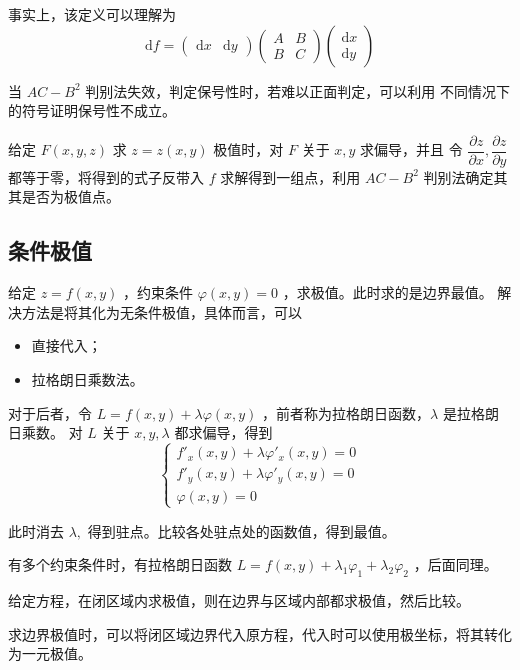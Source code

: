 事实上，该定义可以理解为$$
    \mathrm{d}f = \begin{pmatrix}
        \mathrm{d}x & \mathrm{d}y
    \end{pmatrix}\begin{pmatrix}
        A&B\\B&C
    \end{pmatrix}\begin{pmatrix}
        \mathrm{d}x\\\mathrm{d}y
    \end{pmatrix}
$$ 

当 $ AC-B^2 $ 判别法失效，判定保号性时，若难以正面判定，可以利用
不同情况下的符号证明保号性不成立。

给定 $ F(x,y,z) $ 求 $ z = z(x,y) $ 极值时，对 $ F $ 关于 $ x,y $ 求偏导，并且
令 $ \dfrac{\partial z}{\partial x},\dfrac{\partial z}{\partial y} $ 
都等于零，将得到的式子反带入 $ f $ 求解得到一组点，利用 $ AC-B^2 $ 判别法确定其
其是否为极值点。

\subsection{条件极值}

给定 $ z = f(x,y) $ ，约束条件 $ \varphi(x,y) = 0 $ ，求极值。此时求的是边界最值。
解决方法是将其化为无条件极值，具体而言，可以
\begin{itemize}
    \item 直接代入；
    \item 拉格朗日乘数法。
\end{itemize}

对于后者，令 $ L = f(x,y) + \lambda\varphi(x,y) $ ，前者称为拉格朗日函数，$ \lambda $ 是拉格朗日乘数。
对 $ L $ 关于 $ x,y,\lambda $ 都求偏导，得到
$$
    \begin{cases}
        f'_x(x,y) + \lambda\varphi'_x(x,y) = 0\\ 
        f'_y(x,y) + \lambda\varphi'_y(x,y) = 0\\ 
        \varphi(x,y) = 0
    \end{cases}
$$ 

此时消去 $ \lambda, $ 得到驻点。比较各处驻点处的函数值，得到最值。

有多个约束条件时，有拉格朗日函数 $ L = f(x,y) + \lambda_1\varphi_1 + \lambda_2\varphi_2 $ ，后面同理。

给定方程，在闭区域内求极值，则在边界与区域内部都求极值，然后比较。

求边界极值时，可以将闭区域边界代入原方程，代入时可以使用极坐标，将其转化为一元极值。

